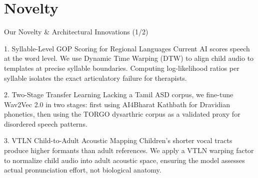 \documentclass[aspectratio=169, 11pt, xcolor=table]{beamer}
\begin{document}
\section{Novelty}
\begin{frame}{Our Novelty \& Architectural Innovations (1/2)}
    \vspace{-2mm}
    \begin{block}{\small 1. Syllable-Level GOP Scoring for Regional Languages}
        \footnotesize
        Current AI scores speech at the word level. We use Dynamic Time Warping (DTW) to align child audio to templates at precise syllable boundaries. Computing log-likelihood ratios per syllable isolates the exact articulatory failure for therapists.
    \end{block}
    \vspace{2mm}
    
    \begin{block}{\small 2. Two-Stage Transfer Learning}
        \footnotesize
        Lacking a Tamil ASD corpus, we fine-tune Wav2Vec 2.0 in two stages: first using AI4Bharat Kathbath for Dravidian phonetics, then using the TORGO dysarthric corpus as a validated proxy for disordered speech patterns.
    \end{block}
    \vspace{2mm}

    \begin{block}{\small 3. VTLN Child-to-Adult Acoustic Mapping}
        \footnotesize
        Children's shorter vocal tracts produce higher formants than adult references. We apply a VTLN warping factor to normalize child audio into adult acoustic space, ensuring the model assesses actual pronunciation effort, not biological anatomy.
    \end{block}
\end{frame}
\end{document}
